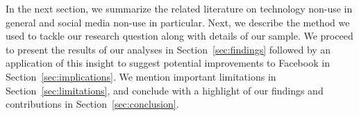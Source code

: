 In the next section, we summarize the related literature on technology non-use in general and social media non-use in particular. Next, we describe the method we used to tackle our research question along with details of our sample. We proceed to present the results of our analyses in Section~\ref{sec:findings} followed by an application of this insight to suggest potential improvements to Facebook in Section~\ref{sec:implications}. We mention important limitations in Section~\ref{sec:limitations}, and conclude with a highlight of our findings and contributions in Section~\ref{sec:conclusion}.


